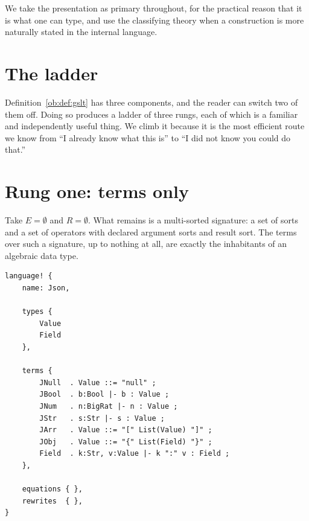 We take the presentation as primary throughout, for the practical reason that it is what
one can type, and use the classifying theory when a construction is more naturally stated
in the internal language.

\section{The ladder}
\label{ob:subsec:ladder}

Definition~\ref{ob:def:gslt} has three components, and the reader can switch two of them
off. Doing so produces a ladder of three rungs, each of which is a familiar and
independently useful thing. We climb it because it is the most efficient route we know
from ``I already know what this is'' to ``I did not know you could do that.''

\begin{center}
\end{center}

\section{Rung one: terms only}

Take $E = \emptyset$ and $R = \emptyset$. What remains is a multi-sorted signature: a
set of sorts and a set of operators with declared argument sorts and result sort. The
terms over such a signature, up to nothing at all, are exactly the inhabitants of an
algebraic data type.

\begin{lstlisting}
language! {
    name: Json,

    types {
        Value
        Field
    },

    terms {
        JNull  . Value ::= "null" ;
        JBool  . b:Bool |- b : Value ;
        JNum   . n:BigRat |- n : Value ;
        JStr   . s:Str |- s : Value ;
        JArr   . Value ::= "[" List(Value) "]" ;
        JObj   . Value ::= "{" List(Field) "}" ;
        Field  . k:Str, v:Value |- k ":" v : Field ;
    },

    equations { },
    rewrites  { },
}
\end{lstlisting}

